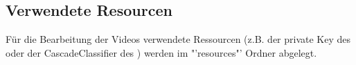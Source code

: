 \subsection{Verwendete Resourcen}
Für die Bearbeitung der Videos verwendete Ressourcen (z.B. der private Key des  oder der CascadeClassifier des ) werden im "'resources"' Ordner abgelegt.
\newpage
